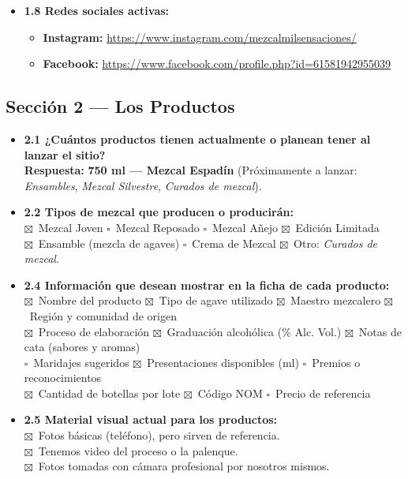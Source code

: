 \documentclass[11pt,letterpaper]{article}
\newcommand{\uchk}{$\square$}
\newcommand{\chk}{\textcolor{mezcalAgave}{$\boxtimes$}}
\begin{document}
\begin{itemize}[leftmargin=1.5em]
    \item \textbf{1.8 Redes sociales activas:}
    \begin{itemize}
        \item \textbf{Instagram:} \url{https://www.instagram.com/mezcalmilsensaciones/}
        \item \textbf{Facebook:} \url{https://www.facebook.com/profile.php?id=61581942955039}
    \end{itemize}
\end{itemize}

\subsection{Sección 2 — Los Productos}
\begin{itemize}[leftmargin=1.5em]
    \item \textbf{2.1 ¿Cuántos productos tienen actualmente o planean tener al lanzar el sitio?}\\
    \textbf{Respuesta:} \textbf{750 ml — Mezcal Espadín} (Próximamente a lanzar: \textit{Ensambles}, \textit{Mezcal Silvestre}, \textit{Curados de mezcal}).

    \item \textbf{2.2 Tipos de mezcal que producen o producirán:}\\
    \chk\ Mezcal Joven \quad
    \uchk\ Mezcal Reposado \quad
    \uchk\ Mezcal Añejo \quad
    \chk\ Edición Limitada \\
    \chk\ Ensamble (mezcla de agaves) \quad
    \uchk\ Crema de Mezcal \quad
    \chk\ Otro: \textit{Curados de mezcal}.

    \item \textbf{2.4 Información que desean mostrar en la ficha de cada producto:}\\
    \chk\ Nombre del producto \quad
    \chk\ Tipo de agave utilizado \quad
    \chk\ Maestro mezcalero \quad
    \chk\ Región y comunidad de origen \\
    \chk\ Proceso de elaboración \quad
    \chk\ Graduación alcohólica (\% Alc. Vol.) \quad
    \chk\ Notas de cata (sabores y aromas) \\
    \uchk\ Maridajes sugeridos \quad
    \chk\ Presentaciones disponibles (ml) \quad
    \uchk\ Premios o reconocimientos \\
    \chk\ Cantidad de botellas por lote \quad
    \chk\ Código NOM \quad
    \uchk\ Precio de referencia

    \item \textbf{2.5 Material visual actual para los productos:}\\
    \chk\ Fotos básicas (teléfono), pero sirven de referencia.\\
    \chk\ Tenemos video del proceso o la palenque.\\
    \chk\ Fotos tomadas con cámara profesional por nosotros mismos.


\end{itemize}
\end{document}
